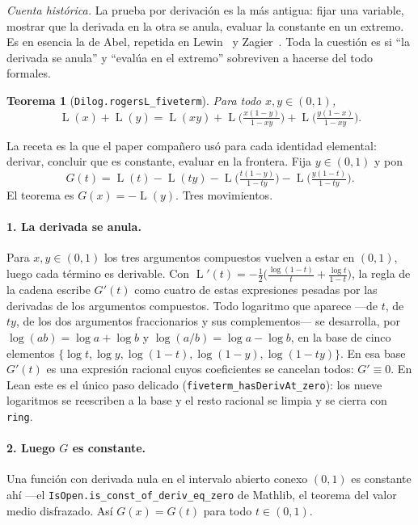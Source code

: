 \documentclass[11pt]{article}
\newtheorem{theorem}{Teorema}
\newcommand{\lean}[1]{\texttt{#1}}
\DeclareMathOperator{\Lrog}{L}
\begin{document}
\emph{Cuenta hist\'orica.} La prueba por derivaci\'on es la m\'as antigua: fijar una
variable, mostrar que la derivada en la otra se anula, evaluar la constante en un extremo. Es
en esencia la de Abel, repetida en Lewin~\cite{lewin} y Zagier~\cite{zagier}. Toda la
cuesti\'on es si ``la derivada se anula'' y ``eval\'ua en el extremo'' sobreviven a hacerse
del todo formales.

\begin{theorem}[\lean{Dilog.rogersL\_fiveterm}]\label{thm:five}
Para todo $x,y\in(0,1)$,
\[
  \Lrog(x)+\Lrog(y)=\Lrog(xy)+\Lrog\!\Big(\tfrac{x(1-y)}{1-xy}\Big)
    +\Lrog\!\Big(\tfrac{y(1-x)}{1-xy}\Big).
\]
\end{theorem}

La receta es la que el paper compa\~nero us\'o para cada identidad elemental: derivar,
concluir que es constante, evaluar en la frontera. Fija $y\in(0,1)$ y pon
\[
  G(t)=\Lrog(t)-\Lrog(ty)-\Lrog\!\Big(\tfrac{t(1-y)}{1-ty}\Big)
    -\Lrog\!\Big(\tfrac{y(1-t)}{1-ty}\Big).
\]
El teorema es $G(x)=-\Lrog(y)$. Tres movimientos.

\paragraph{1. La derivada se anula.} Para $x,y\in(0,1)$ los tres argumentos compuestos
vuelven a estar en $(0,1)$, luego cada t\'ermino es derivable. Con $\Lrog'(t)=
-\tfrac12\big(\tfrac{\log(1-t)}{t}+\tfrac{\log t}{1-t}\big)$, la regla de la cadena escribe
$G'(t)$ como cuatro de estas expresiones pesadas por las derivadas de los argumentos
compuestos. Todo logaritmo que aparece ---de $t$, de $ty$, de los dos argumentos
fraccionarios y sus complementos--- se desarrolla, por $\log(ab)=\log a+\log b$ y
$\log(a/b)=\log a-\log b$, en la base de cinco elementos $\{\log t,\log y,\log(1-t),
\log(1-y),\log(1-ty)\}$. En esa base $G'(t)$ es una expresi\'on racional cuyos coeficientes
se cancelan todos: $G'\equiv0$. En Lean este es el \'unico paso delicado
(\lean{fiveterm\_hasDerivAt\_zero}): los nueve logaritmos se reescriben a la base y el resto
racional se limpia y se cierra con \lean{ring}.

\paragraph{2. Luego $G$ es constante.} Una funci\'on con derivada nula en el intervalo
abierto conexo $(0,1)$ es constante ah\'i ---el \lean{IsOpen.is\_const\_of\_deriv\_eq\_zero}
de Mathlib, el teorema del valor medio disfrazado. As\'i $G(x)=G(t)$ para todo $t\in(0,1)$.
\end{document}
